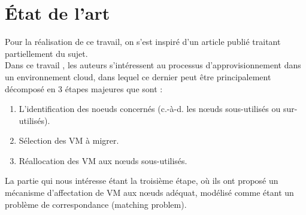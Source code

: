 \section{État de l’art}
Pour la réalisation de ce travail, on s’est inspiré d’un article publié  traitant partiellement du sujet. \\
Dans ce travail \cite{jing2016}, les auteurs s’intéressent au processus d'approvisionnement dans un environnement cloud, dans lequel ce dernier peut être principalement décomposé en 3 étapes majeures que sont : 
\begin{enumerate}
    \item L’identification des noeuds concernés (c.-à-d. les nœuds sous-utilisés ou sur-utilisés). 
    \item Sélection des VM à migrer.
    \item Réallocation des VM aux nœuds sous-utilisés.
\end{enumerate}
La partie qui nous intéresse étant la troisième étape,  où ils ont proposé un mécanisme d’affectation de VM aux nœuds adéquat, modélisé comme étant un problème de correspondance (matching problem).
